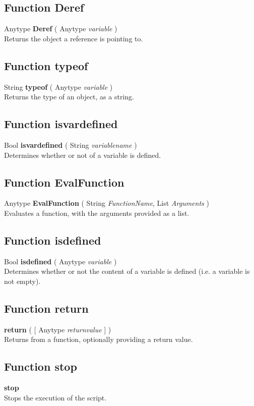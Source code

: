 \subsection{Function Deref \label{F:Deref}}
Anytype \textbf{Deref} ( Anytype \textit{variable} ) \\
Returns the object a reference is pointing to.

\subsection{Function typeof \label{F:typeof}}
String \textbf{typeof} ( Anytype \textit{variable} ) \\
Returns the type of an object, as a string.

\subsection{Function isvardefined \label{F:isvardefined}}
Bool \textbf{isvardefined} ( String \textit{variablename} ) \\
Determines whether or not of a variable is defined.


\subsection{Function EvalFunction \label{F:EvalFunction}}
Anytype \textbf{EvalFunction} ( String \textit{FunctionName}, List \textit{Arguments} ) \\
Evaluates a function, with the arguments provided as a list.

\subsection{Function isdefined \label{F:isdefined}}
Bool \textbf{isdefined} ( Anytype \textit{variable} ) \\
Determines whether or not the content of a variable is defined (i.e. a variable is not empty).

\subsection{Function return \label{F:return}}
\textbf{return} (  [ Anytype \textit{returnvalue} ] ) \\
Returns from a function, optionally providing a return value.


\subsection{Function stop \label{F:stop}}
\textbf{stop} \\
Stops the execution of the script.

